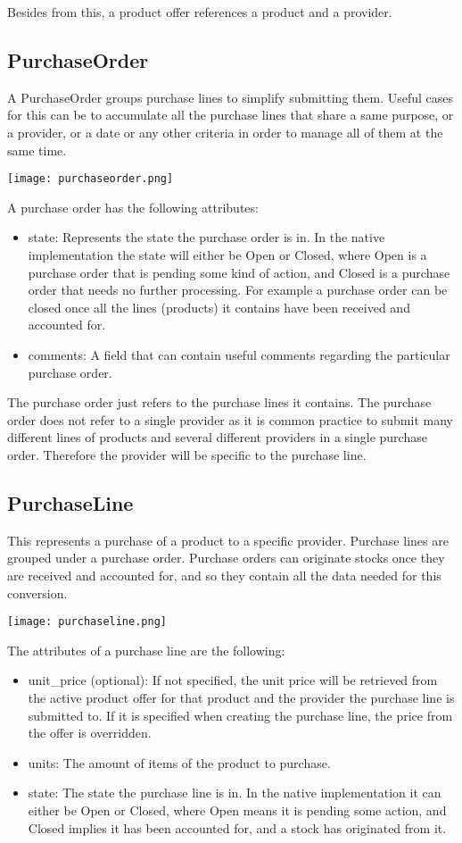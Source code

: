 Besides from this, a product offer references a product and a provider.

\subsection{PurchaseOrder}
A PurchaseOrder groups purchase lines to simplify submitting them. Useful cases for this can be to accumulate all the purchase lines that share a same purpose, or a provider, or a date or any other criteria in order to manage all of them at the same time.
\begin{center}
\texttt{[image: purchaseorder.png]}
\end{center}
A purchase order has the following attributes:

\begin{itemize}
\item state: Represents the state the purchase order is in. In the native implementation the state will either be Open or Closed, where Open is a purchase order that is pending some kind of action, and Closed is a purchase order that needs no further processing. For example a purchase order can be closed once all the lines (products) it contains have been received and accounted for.
\item comments: A field that can contain useful comments regarding the particular purchase order.
\end{itemize}

The purchase order just refers to the purchase lines it contains. The purchase order does not refer to a single provider as it is common practice to submit many different lines of products and several different providers in a single purchase order. Therefore the provider will be specific to the purchase line.

\subsection{PurchaseLine}
This represents a purchase of a product to a specific provider. Purchase lines are grouped under a purchase order. Purchase orders can originate stocks once they are received and accounted for, and so they contain all the data needed for this conversion.
\begin{center}
\texttt{[image: purchaseline.png]}
\end{center}
The attributes of a purchase line are the following:

\begin{itemize}
\item unit\_price (optional): If not specified, the unit price will be retrieved from the active product offer for that product and the provider the purchase line is submitted to. If it is specified when creating the purchase line, the price from the offer is overridden.
\item units: The amount of items of the product to purchase.
\item state: The state the purchase line is in. In the native implementation it can either be Open or Closed, where Open means it is pending some action, and Closed implies it has been accounted for, and a stock has originated from it.
\end{itemize}

